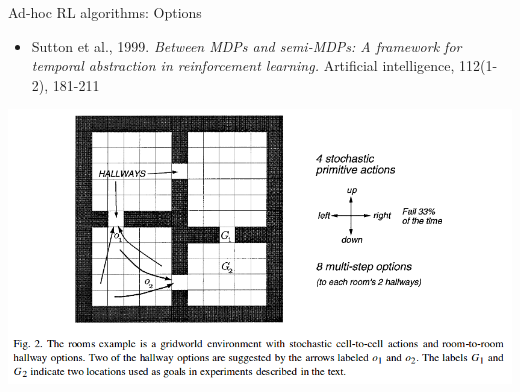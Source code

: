 \documentclass{beamer}
\begin{document}
\begin{frame}{Ad-hoc RL algorithms: Options}
	
	\begin{itemize}
	\item Sutton et al., 1999. \emph{Between MDPs and semi-MDPs: A framework for temporal abstraction in reinforcement learning.} Artificial intelligence, 112(1-2), 181-211
	\end{itemize}
	
	\begin{center}
	\includegraphics[width=0.8\linewidth]{images/options-paper-image}
	\end{center}
	
\end{frame}
\end{document}
